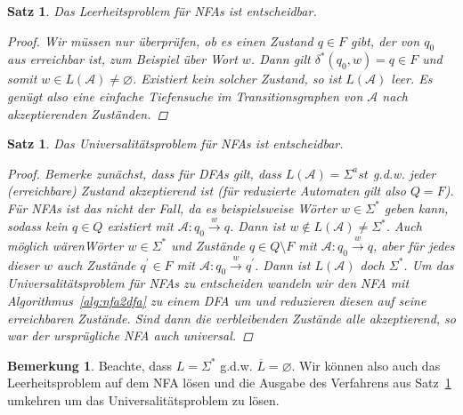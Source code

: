 \documentclass[11pt, a4paper]{article}
\theoremstyle{definition}
\newtheorem*{remark*}{Bemerkung}
\theoremstyle{plain}
\newtheorem{theorem}[definition]{Satz}
\numberwithin{equation}{section}
\newcommand{\comp}[1]{\overline{#1}}
\newcommand{\reaches}{\xrightarrow}
\let\emptyset\varnothing
\begin{document}
\begin{theorem}\label{thm:nfa_emptiness}
	Das Leerheitsproblem für NFAs ist entscheidbar.
	\begin{proof}
		Wir müssen nur überprüfen, ob es einen Zustand $q \in F$ gibt, der von $q_0$ aus erreichbar ist, zum Beispiel über Wort $w$. Dann gilt $\delta^\ast(q_0, w) = q \in F$ und somit $w \in L(\mathcal{A}) \neq \emptyset$. Existiert kein solcher Zustand, so ist $L(\mathcal{A})$ leer. Es genügt also eine einfache Tiefensuche im Transitionsgraphen von $\mathcal{A}$ nach akzeptierenden Zuständen.
	\end{proof}
\end{theorem}
\begin{theorem}\label{thm:nfa_universality}
	Das Universalitätsproblem für NFAs ist entscheidbar.
	\begin{proof}
		Bemerke zunächst, dass für DFAs gilt, dass $L(\mathcal{A}) = \Sigma^ast$ g.d.w. jeder (erreichbare) Zustand akzeptierend ist (für reduzierte Automaten gilt also $Q = F$). Für NFAs ist das nicht der Fall, da es beispielsweise Wörter $w \in \Sigma^\ast$ geben kann, sodass kein $q \in Q$ existiert mit $\mathcal{A}: q_0 \reaches{w} q$. Dann ist $w \notin L(\mathcal{A}) \neq \Sigma^\ast$. Auch möglich wärenWörter $w \in \Sigma^\ast$ und Zustände $q \in Q \setminus F$ mit $\mathcal{A}: q_0 \reaches{w} q$, aber für jedes dieser $w$ auch Zustände $q^\prime \in F$ mit $\mathcal{A}: q_0 \reaches{w} q^\prime$. Dann ist $L(\mathcal{A})$ doch $\Sigma^\ast$. Um das Universalitätsproblem für NFAs zu entscheiden wandeln wir den NFA mit Algorithmus~\ref{alg:nfa2dfa} zu einem DFA um und reduzieren diesen auf seine erreichbaren Zustände. Sind dann die verbleibenden Zustände alle akzeptierend, so war der ursprügliche NFA auch universal.
	\end{proof}
\end{theorem}
\begin{remark*}
	Beachte, dass $L = \Sigma^\ast$ g.d.w. $\comp{L} = \emptyset$. Wir können also auch das Leerheitsproblem auf dem NFA lösen und die Ausgabe des Verfahrens aus Satz~\ref{thm:nfa_emptiness} umkehren um das Universalitätsproblem zu lösen.
\end{remark*}
\end{document}

